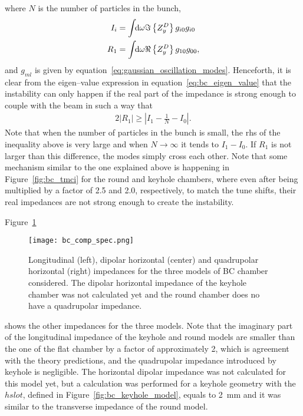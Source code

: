      where $N$ is the number of particles in the bunch,
     \begin{subequations}
         \begin{align}
             I_i &= \int\!\!\text{d}\omega \Im\left\{Z^D_y\right\}g_{i0}g_{i0} \\
             R_1 &= \int\!\!\text{d}\omega \Re\left\{Z^D_y\right\}g_{10}g_{00},
         \end{align}
     \end{subequations}
     and $g_{ml}$ is given by equation~\eqref{eq:gaussian_oscillation_modes}. Henceforth, it is clear from the eigen--value expression in equation~\eqref{eq:bc_eigen_value} that the instability can only happen if the real part of the impedance is strong enough to couple with the beam in such a way that
     \begin{align}
         2|R_1| \ge \left| I_1 - \frac1N - I_0 \right|.
     \end{align}
     Note that when the number of particles in the bunch is small, the \gls{rhs} of the inequality above is very large and when $N\to\infty$ it tends to $I_1-I_0$. If $R_1$ is not larger than this difference, the modes simply cross each other. Note that some mechanism similar to the one explained above is happening in Figure~\ref{fig:bc_tmci} for the round and keyhole chambers, where even after being multiplied by a factor of 2.5 and 2.0, respectively, to match the tune shifts, their real impedances are not strong enough to create the instability.

     Figure~\ref{fig:bc_comp_spec}
     \begin{figure}
         \centering
         \texttt{[image: bc\_comp\_spec.png]}
         \caption[Comparison of impedances of different models of BC chamber.]{Longitudinal (left), dipolar horizontal (center) and quadrupolar horizontal (right) impedances for the three models of BC chamber considered. The dipolar horizontal impedance of the keyhole chamber was not calculated yet and the round chamber does no have a quadrupolar impedance.}
         \label{fig:bc_comp_spec}
     \end{figure}
     shows the other impedances for the three models. Note that the imaginary part of the longitudinal impedance of the keyhole and round models are smaller than the one of the flat chamber by a factor of approximately 2, which is agreement with the theory predictions, and the quadrupolar impedance introduced by keyhole is negligible. The horizontal dipolar impedance was not calculated for this model yet, but a calculation was performed for a keyhole geometry with the $hslot$, defined in Figure~\ref{fig:bc_keyhole_model}, equals to \SI{2}{\milli\meter} and it was similar to the transverse impedance of the round model.

